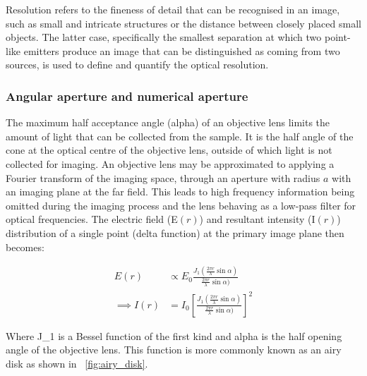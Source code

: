 Resolution refers to the fineness of detail that can be recognised in an image, such as small and intricate structures or the distance between closely placed small objects.
The latter case, specifically the smallest separation at which two point-like emitters produce an image that can be distinguished as coming from two sources, is used to define and quantify the optical resolution.

\subsubsection{Angular aperture and numerical aperture}

The maximum half acceptance angle (\gls{alpha}) of an \gls{objective lens} limits the amount of light that can be collected from the sample.
It is the half angle of the cone at the optical centre of the objective lens, outside of which light is not collected for imaging.
An \gls{objective lens} may be approximated to applying a Fourier transform of the imaging space, through an aperture with radius \(a\) with an imaging plane at the far field.
This leads to high frequency information being omitted during the imaging process and the lens behaving as a low-pass filter for optical frequencies.
The electric field (\gls{E}\((r)\)) and resultant intensity (\gls{I}\((r)\)) distribution of a single point (delta function) at the primary image plane then becomes:

\begin{align}
    E(r) &\propto E_0 \frac{J_1 \left( \frac{2\pi r}{\lambda}\sin \alpha \right)}{ \frac{2\pi r}{\lambda} \sin {\alpha})}\label{eq:E_airy}\\
    \implies
    I(r) &= I_0 \left[\frac{J_1 \left( \frac{2\pi r}{\lambda} \sin \alpha \right)}{ \frac{2\pi r}{\lambda} \sin {\alpha})}\right]^2\label{eq:I_airy}
\end{align}

Where \gls{J_1} is a Bessel function of the first kind and \gls{alpha} is the half opening angle of the objective lens.
This function is more commonly known as an \Gls{airy disk} as shown in \figurename~\ref{fig:airy_disk}.

